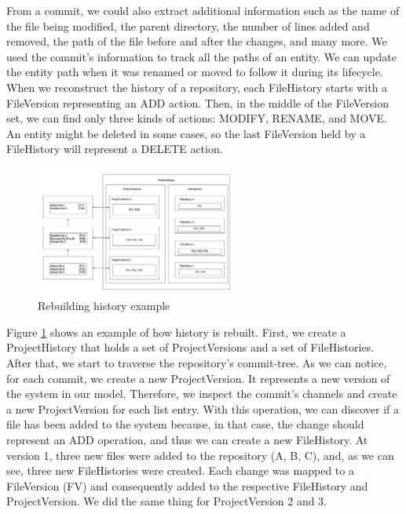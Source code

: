 From a commit, we could also extract additional information such as the name of the file being modified, the parent directory, the number of lines added and removed, the path of the file before and after the changes, and many more.
We used the commit's information to track all the paths of an entity. We can update the entity path when it was renamed or moved to follow it during its lifecycle. \\
\linebreak
When we reconstruct the history of a repository, each FileHistory starts with a FileVersion representing an ADD action. Then, in the middle of the FileVersion set, we can find only three kinds of actions: MODIFY, RENAME, and MOVE. 
An entity might be deleted in some cases, so the last FileVersion held by a FileHistory will represent a DELETE action. 

\begin{figure}
    \includegraphics[width=0.6\textwidth]{ApproachExample.png}
    \caption{Rebuilding history example}
    \label{fig:ApproachExample}
\end{figure}

Figure \ref{fig:ApproachExample} shows an example of how history is rebuilt. 
First, we create a ProjectHistory that holds a set of ProjectVersions and a set of FileHistories. 
After that, we start to traverse the repository's commit-tree.
As we can notice, for each commit, we create a new ProjectVersion. It represents a new version of the system in our model. 
Therefore, we inspect the commit's channels and create a new ProjectVersion for each list entry.
With this operation, we can discover if a file has been added to the system because, in that case, the change should represent an ADD operation, and thus we can create a new FileHistory. 
At version 1, three new files were added to the repository (A, B, C), and, as we can see, three new FileHistories were created.
Each change was mapped to a FileVersion (FV) and consequently added to the respective FileHistory and ProjectVersion. 
We did the same thing for ProjectVersion 2 and 3. 


